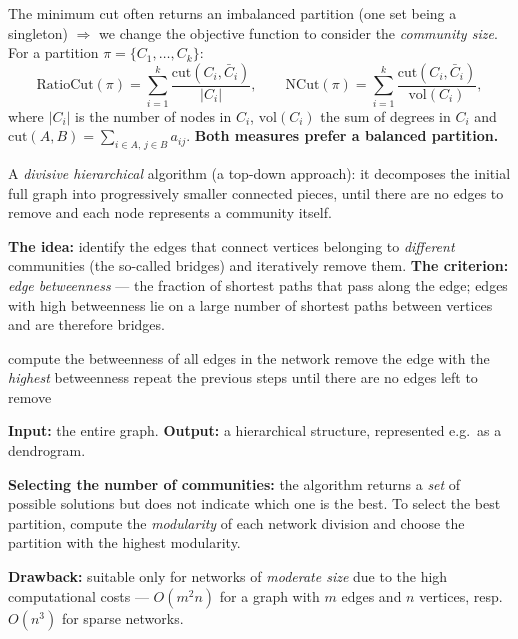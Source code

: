 \documentclass[11pt,a4paper]{article}
\theoremstyle{definition}
\begin{document}
\begin{defbox}
The minimum cut often returns an imbalanced partition (one set being a singleton) $\Rightarrow$ we
change the objective function to consider the \emph{community size}. For a partition
$\pi=\{C_1,\dots,C_k\}$:
\[ \mathrm{RatioCut}(\pi)=\sum_{i=1}^{k}\frac{\mathrm{cut}(C_i,\bar C_i)}{|C_i|},\qquad
   \mathrm{NCut}(\pi)=\sum_{i=1}^{k}\frac{\mathrm{cut}(C_i,\bar C_i)}{\mathrm{vol}(C_i)}, \]
where $|C_i|$ is the number of nodes in $C_i$, $\mathrm{vol}(C_i)$ the sum of degrees in $C_i$ and
$\mathrm{cut}(A,B)=\sum_{i\in A,\,j\in B}a_{ij}$. \textbf{Both measures prefer a balanced partition.}
\end{defbox}

\begin{defbox}
A \emph{divisive hierarchical} algorithm (a top-down approach): it decomposes the initial full graph
into progressively smaller connected pieces, until there are no edges to remove and each node
represents a community itself.

\textbf{The idea:} identify the edges that connect vertices belonging to \emph{different} communities
(the so-called bridges) and iteratively remove them. \textbf{The criterion:} \emph{edge betweenness}
--- the fraction of shortest paths that pass along the edge; edges with high betweenness lie on a
large number of shortest paths between vertices and are therefore bridges.

\begin{algorithmic}[1]
\State compute the betweenness of all edges in the network
\State remove the edge with the \emph{highest} betweenness
\State repeat the previous steps until there are no edges left to remove
\end{algorithmic}
\textbf{Input:} the entire graph. \textbf{Output:} a hierarchical structure, represented e.g.\ as a
dendrogram.

\textbf{Selecting the number of communities:} the algorithm returns a \emph{set} of possible
solutions but does not indicate which one is the best. To select the best partition, compute the
\emph{modularity} of each network division and choose the partition with the highest modularity.

\textbf{Drawback:} suitable only for networks of \emph{moderate size} due to the high computational
costs --- $O(m^2n)$ for a graph with $m$ edges and $n$ vertices, resp.\ $O(n^3)$ for sparse networks.
\end{defbox}
\end{document}
